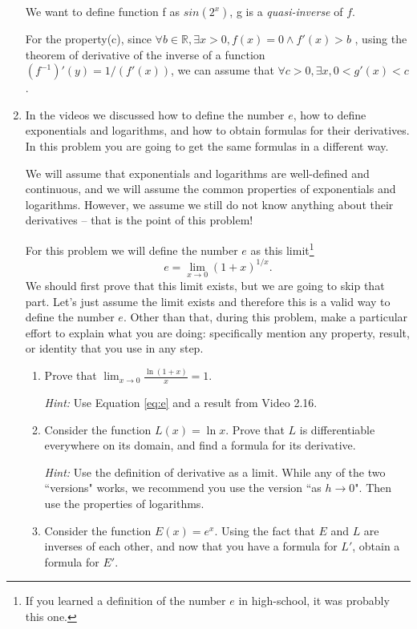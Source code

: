 \documentclass[12pt]{exam}
\newcommand {\DS} [1] {${\displaystyle #1}$}
\newcommand{\vv}{\vspace{.1cm}}
\newcommand{\R}{\mathbb{R}}
\begin{document}
\begin{enumerate}
We want to define function f as $sin(2^x)$, g is a \emph{quasi-inverse} of $f$.

For the property(c), since $\forall b \in \R, \exists x > 0, f(x) = 0 \land f'(x) > b$ , using the theorem of derivative of the inverse of a function $(f^{-1})'(y) = 1/(f'(x))$, 
we can assume that $\forall c > 0, \exists x, 0 < g'(x) < c$.

\vv

\item  In the videos we discussed how to define the number $e$, how to define exponentials and logarithms, and how to obtain formulas for their derivatives.      In this problem you are going to get the same formulas in a different way.

We will assume that exponentials and logarithms are well-defined and continuous, and we will assume the common properties of exponentials and logarithms.   However, we assume we still do not know anything about their derivatives -- that is the point of this problem!

For this problem we will define the number $e$ as this limit\footnote{If you learned a definition of the number $e$ in high-school, it was probably this one.}
	\begin{equation}  \label{eq:e}
		e = \lim_{x \to 0} \left( 1 + x \right)^{1/x}.
	\end{equation}
We should first prove that this limit exists, but we are going to skip that part.  Let's just assume the limit exists and therefore this is a valid way to define the number $e$.
  Other than that, during this problem, make a particular effort to explain what you are doing: specifically mention any property, result, or identity that you use in any step.

	\begin{enumerate}
		\item  Prove that \DS{\lim_{x \to 0} \frac{\ln (1+x)}{x} = 1}.
		
			\emph{Hint:}  Use Equation \eqref{eq:e} and a result from Video 2.16.

		\item  Consider the function $L(x) = \ln x$.  Prove that $L$ is differentiable everywhere on its domain, and find a formula for its derivative.
			
			\emph{Hint:}  Use the definition of derivative as a limit.  While any of the two ``versions" works, we recommend you use the version ``as $h \to 0$".  Then use the properties of logarithms.

		\item  Consider the function \DS{E(x) = e^x}.  Using the fact that $E$ and $L$ are inverses of each other, and now that you have a formula for $L'$, obtain a formula for $E'$.
		

\end{enumerate}
\end{enumerate}
\end{document}
